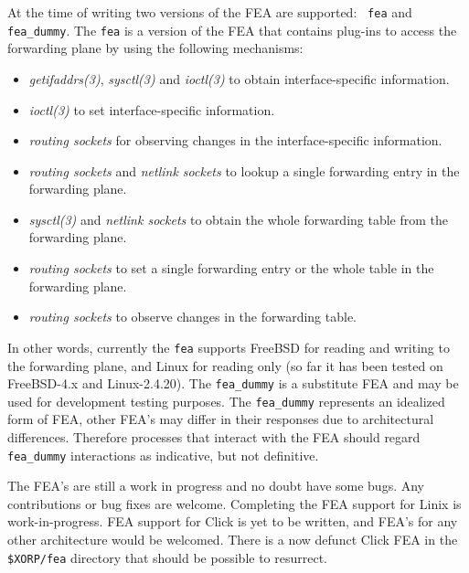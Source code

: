 \documentclass[11pt]{article}
\begin{document}
At the time of writing two versions of the FEA are supported: {\tt
fea} and {\tt fea\_dummy}.  The {\tt fea} is a version
of the FEA that contains plug-ins to access the forwarding plane by
using the following mechanisms:

\begin{itemize}

  \item {\it getifaddrs(3)}, {\it sysctl(3)} and {\it ioctl(3)} to
  obtain interface-specific information.

  \item {\it ioctl(3)} to set interface-specific information.

  \item {\it routing sockets} for observing changes in the
  interface-specific information.

  \item {\it routing sockets} and {\it netlink sockets} to lookup
  a single forwarding entry in the forwarding plane.

  \item {\it sysctl(3)} and {\it netlink sockets} to obtain the whole
  forwarding table from the forwarding plane.

  \item {\it routing sockets} to set a single forwarding entry or the
  whole table in the forwarding plane.

  \item {\it routing sockets} to observe changes in the forwarding
  table.

\end{itemize}

In other words, currently the {\tt fea} supports FreeBSD for reading
and writing to the forwarding plane, and Linux for reading only (so far
it has been tested on FreeBSD-4.x and Linux-2.4.20).
The {\tt fea\_dummy} is a substitute FEA and may be
used for development testing purposes.  The {\tt fea\_dummy}
represents an idealized form of FEA, other FEA's may differ in their
responses due to architectural differences.  Therefore processes that
interact with the FEA should regard {\tt fea\_dummy} interactions as
indicative, but not definitive.

The FEA's are still a work in progress and no doubt have some bugs.
Any contributions or bug fixes are welcome.  Completing the FEA support
for Linix is work-in-progress. FEA support for Click is yet to
be written, and FEA's for any other architecture would
be welcomed.  There is a now defunct Click FEA in the {\tt \$XORP/fea}
directory that should be possible to resurrect.




\end{document}
